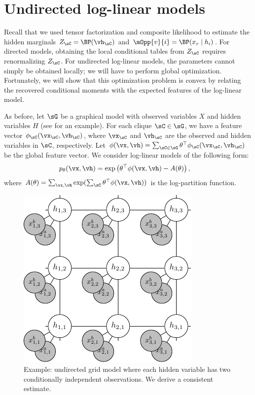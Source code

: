 \section{Undirected log-linear models}
\label{sec:undirected}

Recall that we used tensor factorization and composite likelihood
to estimate the hidden marginals $Z_\sC = \BP(\vh_\sC)$ and $\mOpp{v}{i} = \BP(x_v \mid h_i)$.
For directed models, obtaining the local conditional tables from $Z_\sC$ requires
renormalizing $Z_\sC$.
For undirected log-linear models, the parameters cannot simply be obtained locally;
we will have to perform global optimization.
Fortunately, we will show that this optimization problem is convex
by relating the recovered conditional moments with the expected features of
the log-linear model.

As before, let $\sG$ be a graphical model with observed variables $X$ and hidden variables $H$
(see  for an example).
For each clique $\sC \in \sG$, we have a feature vector $\phi_\sC(\vx_\sC, \vh_\sC)$,
where $\vx_\sC$ and $\vh_\sC$ are the observed and hidden variables in $\sC$, respectively.
Let $\phi(\vx, \vh) = \sum_{\sC \in \sG} \theta^\top \phi_\sC(\vx_\sC,\vh_\sC)$ be the global feature vector.
We consider log-linear models of the following form:
\begin{align}
p_\theta(\vx, \vh) &= \exp\left( \theta^\top \phi(\vx,\vh) - A(\theta) \right),
\end{align}
where $A(\theta) = \sum_{\vx, \vh}  \exp( \sum_\sC \theta^\top \phi(\vx,\vh) )$ is the log-partition function.

\begin{figure}
  \label{fig:examples-mrf}
  \centering
  \includegraphics[width=0.6\columnwidth]{figures/mrf.pdf}
  \caption{Example: undirected grid model where each hidden variable has two
  conditionally independent observations.
  We derive a consistent estimate.}
\end{figure}

